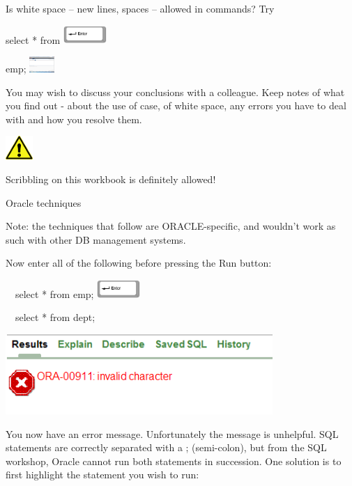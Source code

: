 Is white space -- new lines, spaces -- allowed in commands? Try

select  *  from  
\includegraphics[width=1.63cm,height=0.683cm]{images/img (8).png}
 

 emp; 
\includegraphics[width=0.947cm,height=0.607cm]{images/img (9).png}
 

You may wish to discuss your conclusions with a colleague. Keep notes of what you find out - about the use of case, of white space, any errors you have to deal with and how you resolve them.



\begin{center}
  
\includegraphics[width=1.048cm,height=0.903cm]{images/img (2).png}

\end{center}
Scribbling on this workbook is definitely allowed!

Oracle techniques

Note: the techniques that follow are ORACLE-specific, and wouldn't work as such with other DB management systems.

Now enter all of the following before pressing the Run button:

\ \ select * from emp;  
\includegraphics[width=1.63cm,height=0.683cm]{images/img (8).png}
 

\ \ select * from dept;

\begin{center}
  
\includegraphics[width=10.137cm,height=3.044cm]{images/img (11).png}

\end{center}
You now have an error message.  Unfortunately the message is unhelpful. SQL statements are correctly separated with a ; (semi-colon), but  from the SQL workshop, Oracle cannot run both statements in succession. One solution is to first highlight the statement you wish to run:

